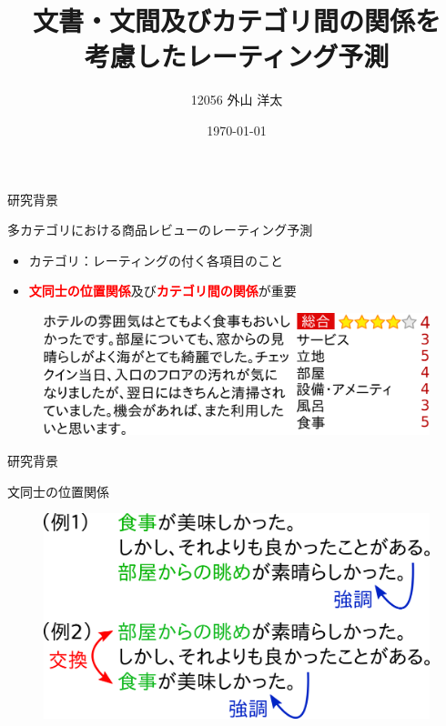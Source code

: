 \documentclass[aspectratio=43,unicode,10pt]{beamer}
\title{文書・文間及びカテゴリ間の関係を\\考慮したレーティング予測}
\institute{知能数理研究室}
\author{12056 外山 洋太}
\date{\today}
\newcommand{\fire}[1]{\textcolor{red}{\textbf{#1}}}
\begin{document}
\begin{frame}
\titlepage
\end{frame}

\begin{frame}{研究背景}{}
  \begin{block}{多カテゴリにおける商品レビューのレーティング予測}
    \begin{itemize}
      \item カテゴリ：レーティングの付く各項目のこと
      \item \fire{文同士の位置関係}及び\fire{カテゴリ間の関係}が重要
    \end{itemize}
  \end{block}
  \begin{figure}
    \includegraphics[width=0.9\linewidth]{fig/review.png}
  \end{figure}
\end{frame}

\begin{frame}{研究背景}{}
  \begin{block}{文同士の位置関係}
    \begin{figure}
      \includegraphics[width=0.8\linewidth]
                      {fig/why_orders_of_sentences_count.png}
    \end{figure}
  \end{block}
\end{frame}
\end{document}

